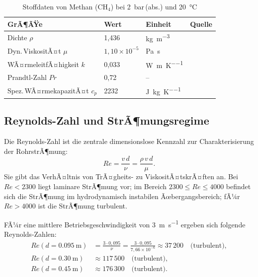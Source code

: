 ﻿\documentclass[12pt,a4paper,twoside]{article}
\theoremstyle{plain}
\theoremstyle{definition}
\theoremstyle{remark}
\newcommand{\Rey}{\mathit{Re}}
\newcommand{\Pra}{\mathit{Pr}}
\begin{document}
\begin{table}[htbp]
\centering
\caption{Stoffdaten von Methan ($\mathrm{CH_4}$) bei \SI{2}{\bar}\,(abs.)
         und \SI{20}{\degreeCelsius}}
\label{tab:stoffdaten}
\begin{tabularx}{\linewidth}{@{}lllX@{}}
\toprule
GrÃ¶ÃŸe & Wert & Einheit & Quelle \\
\midrule
Dichte $\rho$           & 1{,}436   & \si{\kilogram\per\metre\cubed} & \cite{Baehr2016} \\
Dyn.\,ViskositÃ¤t $\mu$  & $1{,}10\times10^{-5}$ & \si{\pascal\second} & \cite{Baehr2016} \\
WÃ¤rmeleitfÃ¤higkeit $k$  & 0{,}033   & \si{\watt\per\metre\per\kelvin} & \cite{Baehr2016} \\
Prandtl-Zahl $\Pra$     & 0{,}72    & --                              & \cite{Baehr2016} \\
Spez.\,WÃ¤rmekapazitÃ¤t $c_p$ & 2232  & \si{\joule\per\kilogram\per\kelvin} & \cite{Baehr2016} \\
\bottomrule
\end{tabularx}
\end{table}

\subsection{Reynolds-Zahl und StrÃ¶mungsregime}
\label{ssec:reynolds}

Die Reynolds-Zahl ist die zentrale dimensionslose Kennzahl zur Charakterisierung
der RohrstrÃ¶mung:
\begin{equation}
  \Rey = \frac{v \, d}{\nu} = \frac{\rho \, v \, d}{\mu}.
  \label{eq:reynolds}
\end{equation}
Sie gibt das VerhÃ¤ltnis von TrÃ¤gheits- zu ViskositÃ¤tskrÃ¤ften an.
Bei $\Rey < 2300$ liegt laminare StrÃ¶mung vor; im Bereich $2300 \le \Rey \le 4000$
befindet sich die StrÃ¶mung im hydrodynamisch instabilen Ãœbergangsbereich; fÃ¼r
$\Rey > 4000$ ist die StrÃ¶mung turbulent.

FÃ¼r eine mittlere Betriebsgeschwindigkeit von \SI{3}{\metre\per\second} ergeben
sich folgende Reynolds-Zahlen:
\begin{align}
  \Rey(d = \SI{0.095}{\metre}) &= \frac{3 \cdot 0{,}095}{\nu}
    = \frac{3 \cdot 0{,}095}{7{,}66\times10^{-6}} \approx 37\,200
    \quad \text{(turbulent)}, \label{eq:Re_klein} \\
  \Rey(d = \SI{0.30}{\metre})  &\approx 117\,500 \quad \text{(turbulent)}, \\
  \Rey(d = \SI{0.45}{\metre})  &\approx 176\,300 \quad \text{(turbulent)}.
\end{align}
\end{document}
